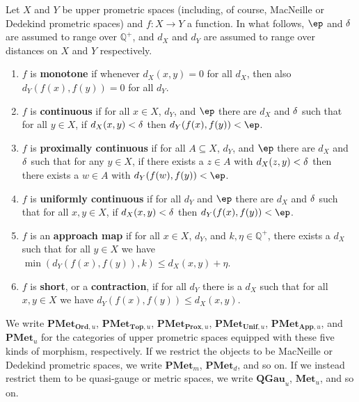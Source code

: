 \documentclass{article}
\def\Qp{\mathbb{Q}^+}
\def\PMet{\mathbf{PMet}}
\def\QGau{\mathbf{QGau}}
\def\Met{\mathbf{Met}}
\def\PMetu{\mathbf{PMet}_u}
\def\PMetTopu{\mathbf{PMet}_{\mathbf{Top},u}}
\def\PMetUnifu{\mathbf{PMet}_{\mathbf{Unif},u}}
\def\PMetProxu{\mathbf{PMet}_{\mathbf{Prox},u}}
\def\PMetAppu{\mathbf{PMet}_{\mathbf{App},u}}
\def\PMetOrdu{\mathbf{PMet}_{\mathbf{Ord},u}}
\begin{document}
\begin{defn}
  Let $X$ and $Y$ be upper prometric spaces (including, of course, MacNeille or Dedekind prometric spaces) and $f:X\to Y$ a function.
  In what follows, $\ep$ and $\delta$ are assumed to range over $\Qp$, and $d_X$ and $d_Y$ are assumed to range over distances on $X$ and $Y$ respectively.
  \begin{enumerate}
  \item $f$ is \textbf{monotone} if whenever $d_X(x,y)=0$ for all $d_X$, then also $d_Y(f(x),f(y))=0$ for all $d_Y$.
  \item $f$ is \textbf{continuous} if for all $x\in X$, $d_Y$, and $\ep$ there are $d_X$ and $\delta$ such that for all $y\in X$, if $d_X(x,y)<\delta$ then $d_Y(f(x),f(y))<\ep$.
  \item $f$ is \textbf{proximally continuous} if for all $A\subseteq X$, $d_Y$, and $\ep$ there are $d_X$ and $\delta$ such that for any $y\in X$, if there exists a $z\in A$ with $d_X(z,y)<\delta$ then there exists a $w\in A$ with $d_Y(f(w),f(y))<\ep$.
  \item $f$ is \textbf{uniformly continuous} if for all $d_Y$ and $\ep$ there are $d_X$ and $\delta$ such that for all $x,y\in X$, if $d_X(x,y)<\delta$ then $d_Y(f(x),f(y))<\ep$.
  \item $f$ is an \textbf{approach map} if for all $x\in X$, $d_Y$, and $k,\eta\in \Qp$, there exists a $d_X$ such that for all $y\in X$ we have $\min(d_Y(f(x),f(y)),k) \le d_X(x,y) +\eta$.
  \item $f$ is \textbf{short}, or a \textbf{contraction}, if for all $d_Y$ there is a $d_X$ such that for all $x,y\in X$ we have $d_Y(f(x),f(y)) \le d_X(x,y)$.
  \end{enumerate}
  We write $\PMetOrdu$, $\PMetTopu$, $\PMetProxu$, $\PMetUnifu$, $\PMetAppu$, and $\PMetu$ for the categories of upper prometric spaces equipped with these five kinds of morphism, respectively.
  If we restrict the objects to be MacNeille or Dedekind prometric spaces, we write $\PMet_m$, $\PMet_d$, and so on.
  If we instead restrict them to be quasi-gauge or metric spaces, we write $\QGau_u$, $\Met_u$, and so on.
\end{defn}
\end{document}
